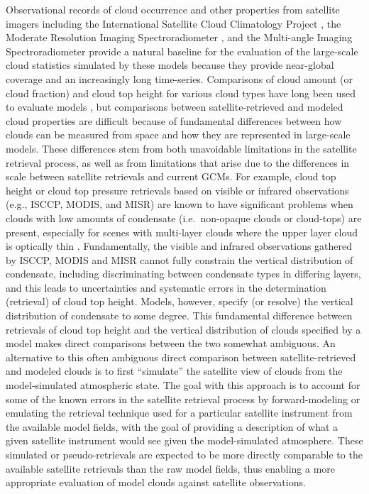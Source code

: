 Observational records of cloud occurrence and other properties from
satellite imagers including the International Satellite Cloud
Climatology Project \citep[ISCCP;][]{rossow_and_schiffer_1999}, the
Moderate Resolution Imaging Spectroradiometer
\citep[MODIS;][]{king_et_al_2003}, and the Multi-angle Imaging
Spectroradiometer \citep[MISR;][]{diner_et_al_2002, diner_et_al_2005}
provide a natural baseline for the evaluation of the large-scale cloud
statistics simulated by these models because they provide near-global
coverage and an increasingly long time-series. Comparisons of cloud
amount (or cloud fraction) and cloud top height for various cloud types
have long been used to evaluate models
\citep{klein_and_jakob_1999, webb_et_al_2001, norris_and_weaver_2001, lin_and_zhang_2004, zhang_et_al_2005, wyant_et_al_2006, gleckler_et_al_2008, marchand_and_ackerman_2010, pincus_et_al_2012, kay_et_al_2012, klein_et_al_2013},
but comparisons between satellite-retrieved and modeled cloud properties
are difficult because of fundamental differences between how clouds can
be measured from space and how they are represented in large-scale
models. These differences stem from both unavoidable limitations in the
satellite retrieval process, as well as from limitations that arise due
to the differences in scale between satellite retrievals and current
GCMs. For example, cloud top height or cloud top pressure retrievals
based on visible or infrared observations (e.g., ISCCP, MODIS, and MISR)
are known to have significant problems when clouds with low amounts of
condensate (i.e.~non-opaque clouds or cloud-tops) are present,
especially for scenes with multi-layer clouds where the upper layer
cloud is optically thin \citep{marchand_et_al_2010, pincus_et_al_2012}.
Fundamentally, the visible and infrared observations gathered by ISCCP,
MODIS and MISR cannot fully constrain the vertical distribution of
condensate, including discriminating between condensate types in
differing layers, and this leads to uncertainties and systematic errors
in the determination (retrieval) of cloud top height. Models, however,
specify (or resolve) the vertical distribution of condensate to some
degree. This fundamental difference between retrievals of cloud top
height and the vertical distribution of clouds specified by a model
makes direct comparisons between the two somewhat ambiguous. An
alternative to this often ambiguous direct comparison between
satellite-retrieved and modeled clouds is to first ``simulate'' the
satellite view of clouds from the model-simulated atmospheric state. The
goal with this approach is to account for some of the known errors in
the satellite retrieval process by forward-modeling or emulating the
retrieval technique used for a particular satellite instrument from the
available model fields, with the goal of providing a description of what
a given satellite instrument would see given the model-simulated
atmosphere. These simulated or pseudo-retrievals are expected to be more
directly comparable to the available satellite retrievals than the raw
model fields, thus enabling a more appropriate evaluation of model
clouds against satellite observations.

